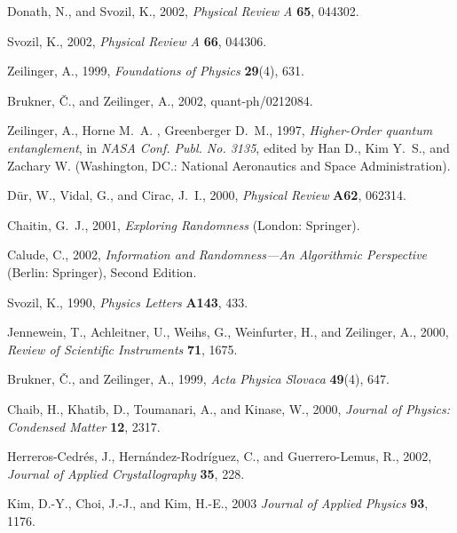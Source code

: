 \documentclass{article}
\begin{document}
%
%
%
%
%
%


\begin{thebibliography}{10}

Donath, N., and Svozil, K., 2002, {\em Physical Review A} {\bf 65}, 044302.

Svozil, K., 2002, {\em Physical Review A} {\bf 66}, 044306.

Zeilinger, A., 1999, {\em Foundations of Physics} {\bf 29}(4), 631.

Brukner, {\v{C}}., and Zeilinger, A., 2002,  quant-ph/0212084.

Zeilinger, A., Horne M.~A. ,  Greenberger D.~M., 1997,
{\em Higher-Order quantum entanglement},
in
{\em NASA Conf. Publ. No. 3135},
edited by Han D., Kim Y.~S., and Zachary W.
(Washington, DC.: National   Aeronautics and Space Administration).

D{\"{u}}r, W., Vidal, G., and Cirac, J.~I.,   2000, {\em Physical Review} {\bf A62}, 062314.

Chaitin, G.~J.,  2001, {\em Exploring Randomness} (London: Springer).

Calude, C., 2002, {\em Information and Randomness---An Algorithmic Perspective}
  (Berlin: Springer), Second Edition.

Svozil, K.,  1990, {\em Physics Letters} {\bf A143}, 433.

Jennewein, T., Achleitner, U., Weihs, G., Weinfurter, H., and Zeilinger, A., 2000, {\em Review
  of Scientific Instruments} {\bf 71}, 1675.

Brukner, {\v{C}}., and Zeilinger, A., 1999, {\em Acta Physica Slovaca} {\bf 49}(4), 647.

Chaib, H., Khatib, D., Toumanari, A., and Kinase, W.,  2000, {\em Journal of Physics:
  Condensed Matter} {\bf 12}, 2317.

Herreros-Cedr{\'e}s, J., Hern{\'a}ndez-Rodr{\'i}guez, C., and Guerrero-Lemus, R., 2002, {\em
  Journal of Applied Crystallography} {\bf 35}, 228.

Kim, D.-Y., Choi, J.-J.,  and Kim, H.-E., 2003 {\em Journal of Applied Physics} {\bf 93}, 1176.


\end{thebibliography}
\end{document}
